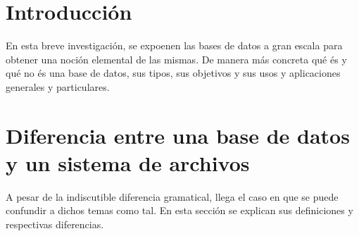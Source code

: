 \documentclass[letterpaper, 12pt]{article}
\begin{document}
    \newpage
    \begin{justify}
        \setcounter{page}{1}
        \thispagestyle{fancy}
        \section{Introducción}
        \justify
        En esta breve investigación, se expoenen las bases de datos a gran escala para obtener una noción elemental de las mismas. De manera más concreta qué és y qué no és una base de datos, sus tipos, sus objetivos y sus usos y aplicaciones generales y particulares.
        \section{Diferencia entre una base de datos y un sistema de archivos}
        \justify
        A pesar de la indiscutible diferencia gramatical, llega el caso en que se puede confundir a dichos temas como tal. En esta sección se explican sus definiciones y respectivas diferencias.

\end{justify}
\end{document}
